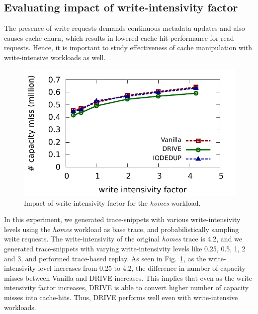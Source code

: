 \subsection{Evaluating impact of write-intensivity factor}
The presence of write requests
demands continuous metadata updates and also causes cache churn, which
results in lowered cache hit performance for read requests. Hence, 
it is important to study effectiveness of cache manipulation with
write-intensive workloads as well. 

\begin{figure}[h]
\centering
\includegraphics[scale=0.78]{confided-figures/write-intensivity-factor/reads-writes/homes-wif.pdf}
\caption{Impact of write-intensivity factor for the \textit{homes} workload.}
\label{fig:wif-impact}
\end{figure}

In this experiment, we generated trace-snippets with various 
write-intensivity
levels using the \textit{homes} workload as base trace, and
probabilistically sampling write requests. The write-intensivity of the
original \textit{homes} trace is 4.2, and we generated trace-snippets
with varying write-intensivity levels like 0.25, 0.5, 1, 2 and 3, and
performed trace-based replay. 
As seen in Fig.~\ref{fig:wif-impact}, as the write-intensivity level
increases from 0.25 to 4.2, the difference in
number of capacity misses between Vanilla and DRIVE increases. 
This implies that even as the write-intensivity factor increases, DRIVE is 
able to convert higher number of capacity misses into cache-hits. 
Thus, DRIVE performs well even with write-intensive workloads.


